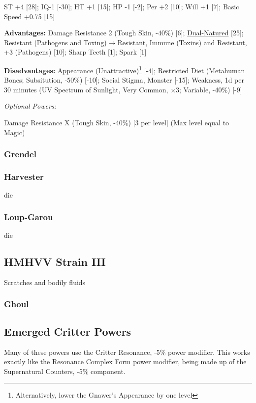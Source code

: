 \begin{multicols*}{3}
	ST +4 [28]; IQ-1 [-30]; HT +1 [15]; HP -1 [-2]; Per +2 [10]; Will +1 [7]; Basic Speed +0.75 [15]
	
	\textbf{Advantages:}
	Damage Resistance 2 (Tough Skin, -40\%) [6]; \hyperref[dual_natured]{Dual-Natured} [25]; Resistant (Pathogens and Toxing)$\rightarrow$Resistant, Immune (Toxins)  and Resistant, +3 (Pathogens) [10]; Sharp Teeth [1]; Spark [1]
	
	\textbf{Disadvantages:}
	Appearance (Unattractive)\footnote{Alternatively, lower the Gnawer's Appearance by one level} [-4]; Restricted Diet (Metahuman Bones; Subsitution, -50\%) [-10]; Social Stigma, Monster [-15]; Weakness, 1d per 30 minutes (UV Spectrum of Sunlight, Very Common, $\times$3; Variable, -40\%) [-9]
	
	\textit{Optional Powers:}
	
	Damage Resistance X (Tough Skin, -40\%) [3 per level] (Max level equal to Magic)
	
	\subsubsection{Grendel}\label{grendel}
	
	\subsubsection{Harvester}\label{harvester}
	die
	
	\subsubsection{Loup-Garou}\label{loup-garou}
	die
	
	\subsection*{HMHVV Strain III}
	
	Scratches and bodily fluids
	
	\subsubsection{Ghoul}\label{ghoul}
	
	\subsection{Emerged Critter Powers}
	
	Many of these powers use the Critter Resonance, -5\% power modifier. This works exactly like the Resonance Complex Form power modifier, being made up of the Supernatural Counters, -5\% component.
	

\end{multicols*}
